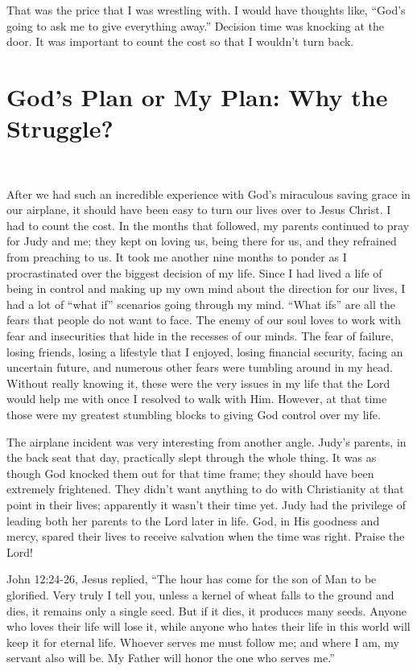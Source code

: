 \documentclass[twoside, 12pt]{book}
\begin{document}
That was the price that I was wrestling with. I would have thoughts like, “God's going to ask me to give everything away.” Decision time was knocking at the door. It was important to count the cost so that I wouldn't turn back.


\chapter{God's Plan or My Plan: Why the Struggle?}
\

After we had such an incredible experience with God's miraculous saving grace in our airplane, it should have been easy to turn our lives over to Jesus Christ. I had to count the cost. In the months that followed, my parents continued to pray for Judy and me; they kept on loving us, being there for us, and they refrained from preaching to us. It took me another nine months to ponder as I procrastinated over the biggest decision of my life. Since I had lived a life of being in control and making up my own mind about the direction for our lives, I had a lot of “what if” scenarios going through my mind. “What ifs” are all the fears that people do not want to face. The enemy of our soul loves to work with fear and insecurities that hide in the recesses of our minds. The fear of failure, losing friends, losing a lifestyle that I enjoyed, losing financial security, facing an uncertain future, and numerous other fears were tumbling around in my head. Without really knowing it, these were the very issues in my life that the Lord would help me with once I resolved to walk with Him. However, at that time those were my greatest stumbling blocks to giving God control over my life. 

The airplane incident was very interesting from another angle. Judy's parents, in the back seat that day, practically slept through the whole thing. It was as though God knocked them out for that time frame; they should have been extremely frightened. They didn't want anything to do with Christianity at that point in their lives; apparently it wasn’t their time yet. Judy had the privilege of leading both her parents to the Lord later in life. God, in His goodness and mercy, spared their lives to receive salvation when the time was right. Praise the Lord!

John 12:24-26, Jesus replied, “The hour has come for the son of Man to be glorified. Very truly I tell you, unless a kernel of wheat falls to the ground and dies, it remains only a single seed. But if it dies, it produces many seeds. Anyone who loves their life will lose it, while anyone who hates their life in this world will keep it for eternal life. Whoever serves me must follow me; and  where I am, my servant also will be. My Father will honor the one who serves me.”
\end{document}
